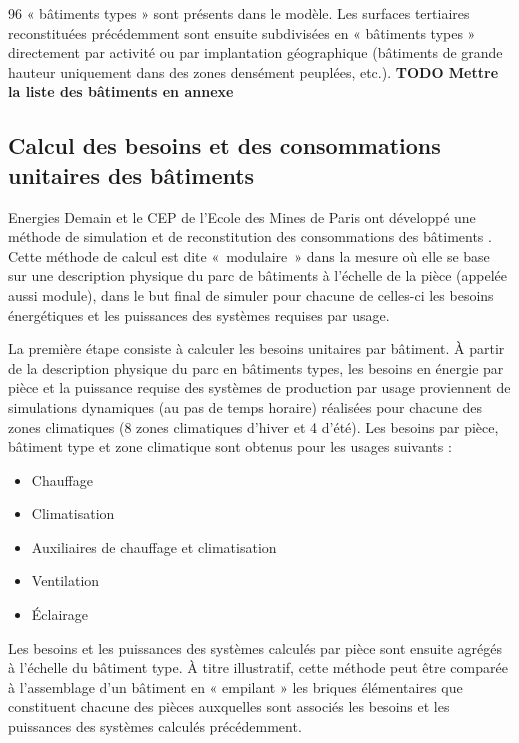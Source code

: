 \documentclass[10.5pt,a4paper]{article}
\begin{document}
{96 « bâtiments types » sont présents dans le modèle. Les surfaces tertiaires reconstituées précédemment sont ensuite subdivisées en « bâtiments types » directement par activité ou par implantation géographique (bâtiments de grande hauteur uniquement dans des zones densément peuplées, etc.).
\textbf{TODO Mettre la liste des bâtiments en annexe} 

\subsection{Calcul des besoins et des consommations unitaires des bâtiments}

Energies Demain et le CEP de l’Ecole des Mines de Paris ont développé une méthode de simulation et de reconstitution des consommations des bâtiments . Cette méthode de calcul est dite «~modulaire~» dans la mesure où elle se base sur une description physique du parc de bâtiments à l’échelle de la pièce (appelée aussi module), dans le but final de simuler pour chacune de celles-ci les besoins énergétiques et les puissances des systèmes requises par usage.

La première étape consiste à calculer les besoins unitaires par bâtiment. À partir de la description physique du parc en bâtiments types, les besoins en énergie par pièce et la puissance requise des systèmes de production par usage proviennent de simulations dynamiques (au pas de temps horaire) réalisées pour chacune des zones climatiques (8 zones climatiques d’hiver et 4 d’été). Les besoins par pièce, bâtiment type et zone climatique sont obtenus pour les usages suivants :

\begin{itemize}
	\item Chauffage
	\item Climatisation
	\item Auxiliaires de chauffage et climatisation
	\item Ventilation
	\item Éclairage
\end{itemize}

Les besoins et les puissances des systèmes calculés par pièce sont ensuite agrégés à l’échelle  du bâtiment type. À titre illustratif, cette méthode peut être comparée à l’assemblage d’un bâtiment en « empilant » les briques élémentaires que constituent chacune des pièces auxquelles sont associés les besoins et les puissances des systèmes calculés précédemment.

}
\end{document}
